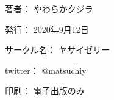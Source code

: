 \clearpage
{}
\begin{flushright}
\begin{minipage}{0.5\hsize}
\begin{description}
  \item{著者：} やわらかクジラ
  \item{発行：} 2020年9月12日
  \item{サークル名：} ヤサイゼリー
  \item{twitter：} @matsuchiy
  \item{印刷：} 電子出版のみ
\end{description}
\end{minipage}
\end{flushright}
\clearpage